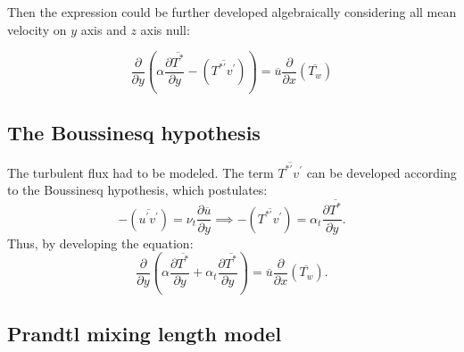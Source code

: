 \documentclass[10pt]{article} %
\begin{document}
Then the expression could be further developed algebraically considering all mean velocity on $y$ axis and $z$ axis null:

\begin{equation}\label{equation_var}
{\frac{\partial{}}{\partial{y}}} \left(\alpha {\frac{\partial{\overline{T^\ast}}}{\partial{y}}}   
- \left(\overline{ T^{\ast\prime} v^\prime}\right) \right)
= 
\overline{u}\frac{\partial{}}{\partial{x}}\left(\overline{T_w}\right)  
\end{equation}



\subsection{The Boussinesq hypothesis}

The turbulent flux had to be modeled. The term $\overline{T^{\ast\prime}  v^\prime}$ 
can be developed according to the Boussinesq hypothesis, which postulates:
\begin{equation}\label{bou}
-\left(\overline{ u^\prime  v^\prime}\right) = 
\nu_t \frac{\partial{\overline{u}}}{\partial{y}}
\implies
-\left(\overline{ T^{\ast\prime}  v^\prime}\right) = 
\alpha_t \frac{\partial{\overline{T^\ast}}}{\partial{y}}.
\end{equation}
Thus, by developing the equation:
\\
\begin{equation}
{\frac{\partial{}}{\partial{y}}} \left(\alpha {\frac{\partial{\overline{T^\ast}}}{\partial{y}}}   
+ \alpha_t  \frac{\partial \overline{T^\ast}}{\partial y} \right)
= 
\overline{u}\frac{\partial{}}{\partial{x}}\left(\overline{T_w}\right) . 
\end{equation}

\subsection{Prandtl mixing length model} 
\end{document}
